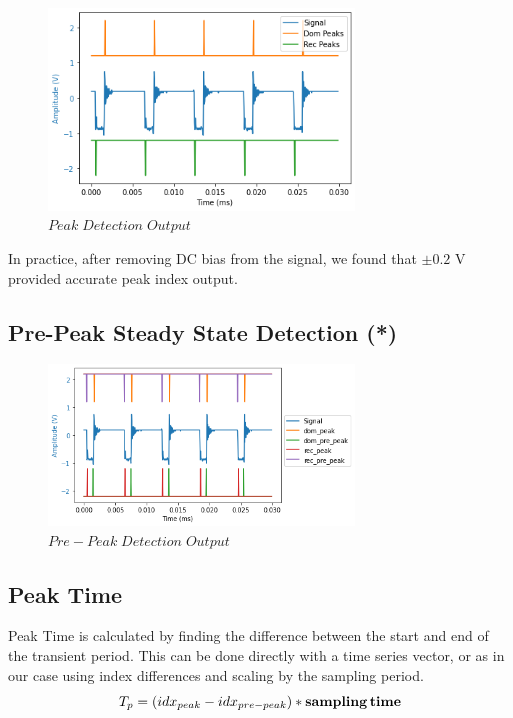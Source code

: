 \documentclass[conference]{IEEEtran}
\begin{document}
\begin{figure}[htb]
\centering
\includegraphics[width=3.2in]{figures/50_peak.png}
\caption{$Peak\;Detection\;Output$}
\label{fig:Peak}
\end{figure}

In practice, after removing DC bias from the signal, we found that $\pm 0.2$ V provided accurate peak index output.

\subsection{Pre-Peak Steady State Detection (*)}
\begin{figure}[htb]
\centering
\includegraphics[width=3.2in]{figures/51_prepeak.png}
\caption{$Pre-Peak\;Detection\;Output$}
\label{fig:Prepeak}
\end{figure}

\subsection{Peak Time}
Peak Time is calculated by finding the difference between the start and end of the transient period. This can be done directly with a time series vector, or as in our case using index differences and scaling by the sampling period.
\begin{equation*}
T_p = (idx_{peak} - idx_{pre-peak}) * \textbf{sampling\,time}   
\end{equation*}
\end{document}
